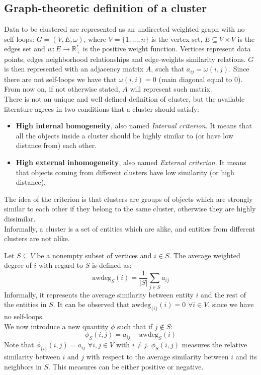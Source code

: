 \subsection{Graph-theoretic definition of a cluster}
Data to be clustered are represented as an undirected weighted graph with no self-loops: $G=(V, E, \omega)$, where $V=\{1,\dots,n\}$ is the vertex set, $E\subseteq V\times V$ is the edges set and $w: E\rightarrow \mathbb{R}^*_+$ is the positive weight function. Vertices represent data points, edges neighborhood relationships and edge-weights similarity relations. $G$ is then represented with an adjacency matrix $A$, such that $a_{ij} = \omega(i,j)$. Since there are not self-loops we have that $\omega(i,i) = 0$ (main diagonal equal to $0$). From now on, if not otherwise stated, $A$ will represent such matrix. \\
There is not an unique and well defined definition of cluster, but the available literature agrees in two conditions that a cluster should satisfy:
\begin{itemize}
  \item \textbf{High internal homogeneity}, also named \textit{Internal criterion}. It means that all the objects inside a cluster should be highly similar to (or have low distance from) each other.
  \item \textbf{High external inhomogeneity}, also named \textit{External criterion}. It means that objects coming from different clusters have low similarity (or high distance).
\end{itemize}
The idea of the criterion is that clusters are groups of objects which are strongly similar to each other if they belong to the same cluster, otherwise they are highly dissimilar.\\
Informally, a cluster is a set of entities which are alike, and entities from different clusters are not alike.

Let $S\subseteq V$ be a nonempty subset of vertices and $i \in S$. The average weighted degree of $i$ with regard to $S$ is defined as:\\
\begin{equation}
  \text{awdeg}_S(i)=\frac{1}{|S|}\sum_{j\in S}a_{ij}
\end{equation}
Informally, it represents the average similarity between entity $i$ and the rest of the entities in $S$.
It can be observed that $\text{awdeg}_{\{i\}}(i) = 0$  $\forall i \in V$, since we have no self-loops.\\
We now introduce a new quantity $\phi$ such that if $j \notin S$:
\begin{equation}
  \phi_S(i, j)=a_{ij}-\text{awdeg}_S(i)
\end{equation}
Note that $\phi_{\{i\}}(i, j)=a_{ij}$ $\forall i, j\in V$ with $i \neq j$. $\phi_S(i, j)$ measures the relative similarity between $i$ and $j$ with respect to the average similarity between $i$ and its neighbors in $S$. This measures can be either positive or negative.

